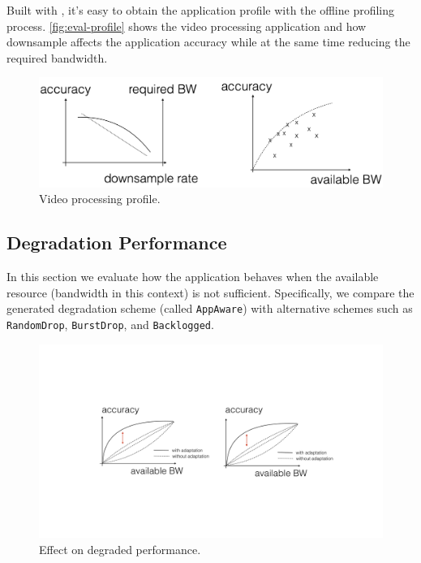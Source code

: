 Built with \sysname{}, it's easy to obtain the application profile with the
offline profiling process. \autoref{fig:eval-profile} shows the video processing
application and how downsample affects the application accuracy while at the
same time reducing the required bandwidth.

\begin{figure}
  \centering
  \includegraphics[width=.95\linewidth]{figures/tradeoff-placeholder.png}
  \caption{Video processing profile.}
  \label{fig:eval-profile}
\end{figure}

\subsection{Degradation Performance}
\label{sec:degr-perf}

In this section we evaluate how the application behaves when the available
resource (bandwidth in this context) is not sufficient. Specifically, we compare
the generated degradation scheme (called \texttt{AppAware}) with alternative
schemes such as \texttt{RandomDrop}, \texttt{BurstDrop}, and
\texttt{Backlogged}.

\begin{figure}
  \centering
  \includegraphics[width=.95\linewidth]{figures/degrade-placeholder.pdf}
  \caption{Effect on degraded performance.}
  \label{fig:degrade}
\end{figure}

